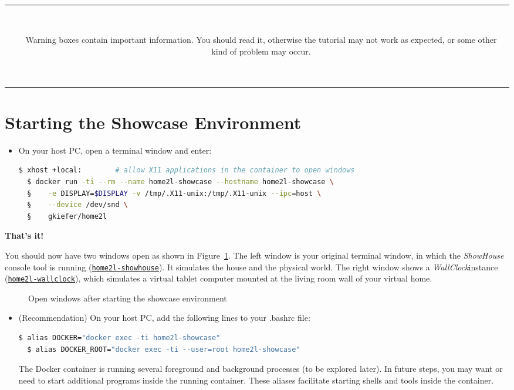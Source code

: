 \documentclass[12pt,english,parskip=half,headheight=19pt]{scrreprt}
\newcommand{\figsvg}[2][]{}            %
\newcommand{\figsvg}[2][]{\href{#2}{}} %
\newcommand{\lstf}[1]{\colorbox{lstbackground}{\ttfamily\footnotesize#1}}
\newcommand{\warnbox}[1]{
  \par
  \medskip
  \hfill
  \setlength\arrayrulewidth{1pt}
  \begin{tabular}[b]{c|c|}
    
    &
    \,\parbox{0.89\linewidth}{\setlength{\parskip}{0.5em}#1}\,
  \end{tabular}
  \medskip
  \par
}
\newcommand{\idx}[1]{#1\index{#1}}
\newcommand{\reftool}[1]{\hyperref[tool:#1]{\texttt{\idx{#1}}}}
\begin{document}
\warnbox{
  Warning boxes contain important information. You should read it, otherwise the tutorial may not work
  as expected, or some other kind of problem may occur.
}





\clearpage
\section{Starting the Showcase Environment}
\label{sec:tutorial-start}


\begin{itemize}[$\blacktriangleright$]

\item
  On your host PC, open a terminal window and enter:
  \begin{lstlisting}[language=bash]
  $ xhost +local:        # allow X11 applications in the container to open windows
  $ docker run -ti --rm --name home2l-showcase --hostname home2l-showcase \
  §    -e DISPLAY=$DISPLAY -v /tmp/.X11-unix:/tmp/.X11-unix --ipc=host \
  §    --device /dev/snd \
  §    gkiefer/home2l
  \end{lstlisting}

\end{itemize}

\textbf{That's it!}

You should now have two windows open as shown in Figure~\ref{fig:tutorial-start}. The left window is your original terminal window, in which the \textit{ShowHouse} console tool is running (\reftool{home2l-showhouse}). It simulates the house and the physical world. The right window shows a \textit{WallClock}instance (\reftool{home2l-wallclock}), which simulates a virtual tablet computer mounted at the living room wall of your virtual home.

\begin{figure}[ht]
  \centering
  \figsvg[width=0.95\linewidth,keepaspectratio]{figs/tutorial-start.svg}
  \caption[l]{Open windows after starting the showcase environment}
  \label{fig:tutorial-start}
\end{figure}

\begin{itemize}[$\blacktriangleright$]
\item
  (Recommendation) On your host PC, add the following lines to your \lstf{.bashrc} file:
  \begin{lstlisting}[language=bash]
  $ alias DOCKER="docker exec -ti home2l-showcase"
  $ alias DOCKER_ROOT="docker exec -ti --user=root home2l-showcase"
  \end{lstlisting}
  The Docker container is running several foreground and background processes (to be explored later).
  In future steps, you may want or need to start additional programs inside the running container.
  These aliases facilitate starting shells and tools inside the container.
\end{itemize}
\end{document}
